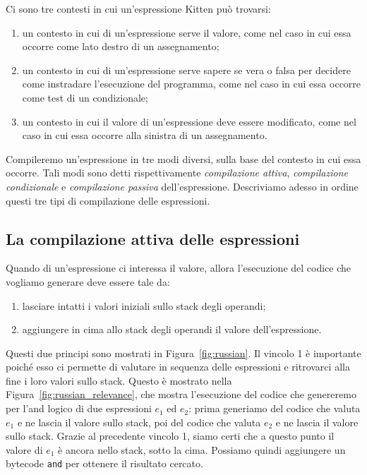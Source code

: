 Ci sono tre contesti in cui un'espressione Kitten pu\`o trovarsi:
%
\begin{enumerate}
\item un contesto in cui di un'espressione serve il valore, come
      nel caso in cui essa occorre come lato destro di un assegnamento;
\item un contesto in cui di un'espressione serve sapere se \e vera o falsa
      per decidere come instradare l'esecuzione del programma, come nel
      caso in cui essa occorre come test di un condizionale;
\item un contesto in cui il valore di un'espressione deve essere modificato,
      come nel caso in cui essa occorre alla sinistra di un assegnamento.
\end{enumerate}
%
Compileremo un'espressione in tre modi diversi,
sulla base del contesto in cui essa occorre. Tali modi
sono detti rispettivamente
\emph{compilazione attiva}, \emph{compilazione condizionale} e
\emph{compilazione passiva} dell'espressione. Descriviamo adesso in
ordine questi tre tipi di compilazione delle espressioni.
%
\subsection{La compilazione attiva delle espressioni}
  \label{subsec:active_compilation}
%
Quando di un'espressione ci interessa il valore, allora l'esecuzione
del codice che vogliamo generare deve essere tale da:
%
\begin{enumerate}
\item lasciare intatti i valori iniziali sullo stack degli operandi;
\item aggiungere in cima allo stack degli operandi il valore dell'espressione.
\end{enumerate}
%
Questi due principi sono mostrati in Figura~\ref{fig:russian}. Il
vincolo 1 \`e importante poich\'e esso ci permette di valutare
in sequenza delle espressioni e ritrovarci alla fine i loro
valori sullo stack.
Questo \`e mostrato nella Figura~\ref{fig:russian_relevance},
che mostra l'esecuzione del codice che genereremo per l'and logico
di due espressioni $e_1$ ed $e_2$: prima generiamo del codice che
valuta $e_1$ e ne lascia il valore sullo stack, poi del codice che
valuta $e_2$ e ne lascia il valore sullo stack. Grazie al precedente vincolo
1, siamo certi che a questo punto il valore di $e_1$ \`e ancora nello stack,
sotto la cima. Possiamo quindi aggiungere un bytecode \texttt{and} per
ottenere il risultato cercato.

